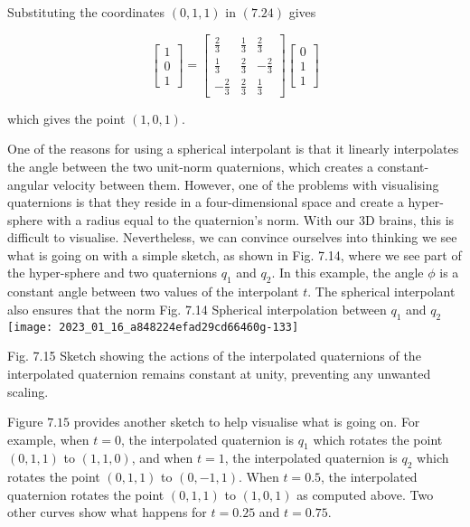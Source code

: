 Substituting the coordinates $(0,1,1)$ in $(7.24)$ gives

$$
\left[\begin{array}{l}
1 \\
0 \\
1
\end{array}\right]=\left[\begin{array}{ccc}
\frac{2}{3} & \frac{1}{3} & \frac{2}{3} \\
\frac{1}{3} & \frac{2}{3} & -\frac{2}{3} \\
-\frac{2}{3} & \frac{2}{3} & \frac{1}{3}
\end{array}\right]\left[\begin{array}{l}
0 \\
1 \\
1
\end{array}\right]
$$

which gives the point $(1,0,1)$.

One of the reasons for using a spherical interpolant is that it linearly interpolates the angle between the two unit-norm quaternions, which creates a constant-angular velocity between them. However, one of the problems with visualising quaternions is that they reside in a four-dimensional space and create a hyper-sphere with a radius equal to the quaternion's norm. With our 3D brains, this is difficult to visualise. Nevertheless, we can convince ourselves into thinking we see what is going on with a simple sketch, as shown in Fig. 7.14, where we see part of the hyper-sphere and two quaternions $q_{1}$ and $q_{2}$. In this example, the angle $\phi$ is a constant angle between two values of the interpolant $t$. The spherical interpolant also ensures that the norm Fig. 7.14 Spherical interpolation between $q_{1}$ and $q_{2}$
\texttt{[image: 2023\_01\_16\_a848224efad29cd66460g-133]}

Fig. 7.15 Sketch showing the actions of the interpolated quaternions of the interpolated quaternion remains constant at unity, preventing any unwanted scaling.

Figure $7.15$ provides another sketch to help visualise what is going on. For example, when $t=0$, the interpolated quaternion is $q_{1}$ which rotates the point $(0,1,1)$ to $(1,1,0)$, and when $t=1$, the interpolated quaternion is $q_{2}$ which rotates the point $(0,1,1)$ to $(0,-1,1)$. When $t=0.5$, the interpolated quaternion rotates the point $(0,1,1)$ to $(1,0,1)$ as computed above. Two other curves show what happens for $t=0.25$ and $t=0.75$.

